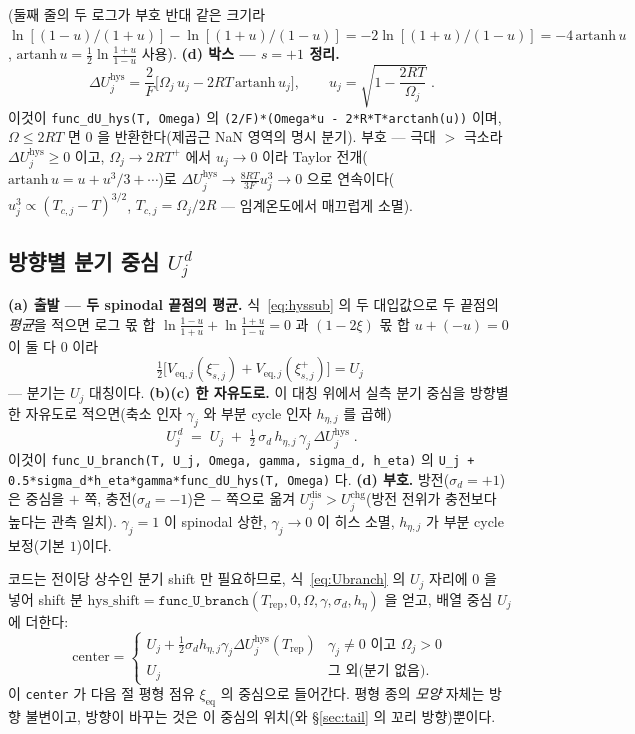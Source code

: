 \documentclass[11pt,a4paper]{article}
\newcommand{\eq}{\mathrm{eq}}
\newcommand{\dis}{\mathrm{dis}}
\newcommand{\chg}{\mathrm{chg}}
\newcommand{\hys}{\mathrm{hys}}
\newcommand{\rep}{\mathrm{rep}}
\newcommand{\code}[1]{\texttt{#1}}
\begin{document}
(둘째 줄의 두 로그가 부호 반대 같은 크기라 $\ln[(1-u)/(1+u)]-\ln[(1+u)/(1-u)]=-2\ln[(1+u)/(1-u)]=-4\,\mathrm{artanh}\,u$,
$\mathrm{artanh}\,u=\tfrac12\ln\tfrac{1+u}{1-u}$ 사용). \textbf{(d) 박스 — $s=+1$ 정리.}
\begin{equation}
\boxed{\;\Delta U_j^\hys
=\frac{2}{F}\Big[\Omega_j\,u_j-2RT\,\mathrm{artanh}\,u_j\Big],
\qquad u_j=\sqrt{1-\frac{2RT}{\Omega_j}}\;.}
\label{eq:dUhys}
\end{equation}
이것이 \code{func\_dU\_hys(T, Omega)} 의 \code{(2/F)*(Omega*u - 2*R*T*arctanh(u))} 이며, $\Omega\le2RT$ 면 $0$ 을
반환한다(제곱근 NaN 영역의 명시 분기). 부호 — 극대 $>$ 극소라 $\Delta U_j^\hys\ge0$ 이고, $\Omega_j\to2RT^+$ 에서
$u_j\to0$ 이라 Taylor 전개($\mathrm{artanh}\,u=u+u^3/3+\cdots$)로 $\Delta U_j^\hys\to\frac{8RT}{3F}u_j^3\to0$ 으로
연속이다($u_j^3\propto(T_{c,j}-T)^{3/2}$, $T_{c,j}=\Omega_j/2R$ — 임계온도에서 매끄럽게 소멸).

\subsection{방향별 분기 중심 $U_j^{\,d}$}
\textbf{(a) 출발 — 두 spinodal 끝점의 평균.} 식~\eqref{eq:hyssub} 의 두 대입값으로 두 끝점의 \emph{평균}을 적으면
로그 몫 합 $\ln\frac{1-u}{1+u}+\ln\frac{1+u}{1-u}=0$ 과 $(1-2\xi)$ 몫 합 $u+(-u)=0$ 이 둘 다 $0$ 이라
\begin{equation}
\tfrac12\big[V_{\eq,j}(\xi_{s,j}^-)+V_{\eq,j}(\xi_{s,j}^+)\big]=U_j
\label{eq:hyssym}
\end{equation}
— 분기는 $U_j$ 대칭이다. \textbf{(b)(c) 한 자유도로.} 이 대칭 위에서 실측 분기 중심을 방향별 한 자유도로 적으면(축소
인자 $\gamma_j$ 와 부분 cycle 인자 $h_{\eta,j}$ 를 곱해)
\begin{equation}
\boxed{\;U_j^{\,d}\;=\;U_j\;+\;\tfrac12\,\sigma_d\,h_{\eta,j}\,\gamma_j\,\Delta U_j^\hys\;.}
\label{eq:Ubranch}
\end{equation}
이것이 \code{func\_U\_branch(T, U\_j, Omega, gamma, sigma\_d, h\_eta)} 의
\code{U\_j + 0.5*sigma\_d*h\_eta*gamma*func\_dU\_hys(T, Omega)} 다. \textbf{(d) 부호.} 방전($\sigma_d=+1$)은 중심을
$+$ 쪽, 충전($\sigma_d=-1$)은 $-$ 쪽으로 옮겨 $U_j^{\dis}>U_j^{\chg}$(방전 전위가 충전보다 높다는 관측 일치).
$\gamma_j=1$ 이 spinodal 상한, $\gamma_j\to0$ 이 히스 소멸, $h_{\eta,j}$ 가 부분 cycle 보정(기본 $1$)이다.

코드는 전이당 상수인 분기 shift 만 필요하므로, 식~\eqref{eq:Ubranch} 의 $U_j$ 자리에 $0$ 을 넣어 shift 분
$\mathrm{hys\_shift}=\code{func\_U\_branch}(T_\rep,0,\Omega,\gamma,\sigma_d,h_\eta)$ 을 얻고, 배열 중심 $U_j$ 에 더한다:
\begin{equation}
\mathrm{center}=
\begin{cases}
U_j+\tfrac12\sigma_d h_{\eta,j}\gamma_j\Delta U_j^\hys(T_\rep) & \gamma_j\ne0 \text{ 이고 } \Omega_j>0\\[2pt]
U_j & \text{그 외(분기 없음)}.
\end{cases}
\label{eq:center}
\end{equation}
이 \code{center} 가 다음 절 평형 점유 $\xi_\eq$ 의 중심으로 들어간다. 평형 종의 \emph{모양} 자체는 방향 불변이고,
방향이 바꾸는 것은 이 중심의 위치(와 \S\ref{sec:tail} 의 꼬리 방향)뿐이다.
\end{document}
